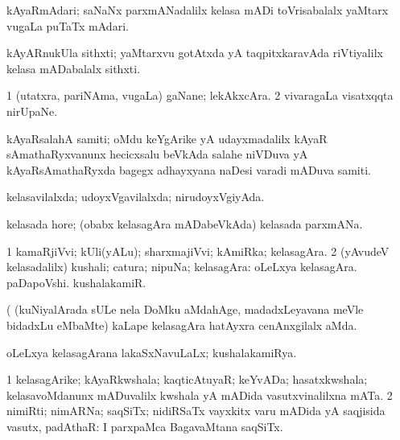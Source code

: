 \bentry
{} 
\gl{\nA}
\expl{}
\bmng
kAyaRmAdari; saNaNx parxmANadalilx kelasa mADi toVrisabalalx yaMtarx \mo vugaLa puTaTx mAdari. 
\emng
\eentry

\bentry
{} 
\gl{\nA}
\expl{}
\bmng
kAyARnukUla sithxti; yaMtarxvu gotAtxda yA taqpitxkaravAda riVtiyalilx kelasa mADabalalx sithxti. 
\emng
\eentry

\bentry
{} 
\gl{\nA}
\expl{}
\bmng
\bnum
\num{1} (utatxra, pariNAma, \mo vugaLa) gaNane; lekAkxcAra. 
\num{2} vivaragaLa visatxqqta nirUpaNe. 
\enum
\emng
\eentry

\bentry
{} 
\gl{\nA}
\expl{}
\bmng
kAyaRsalahA samiti; oMdu keYgArike yA udayxmadalilx kAyaR sAmathaRyxvanunx hecicxsalu beVkAda salahe niVDuva yA kAyaRsAmathaRyxda bagegx adhayxyana naDesi varadi mADuva samiti. 
\emng
\eentry

\bentry
{} 
\gl{\gu}
\expl{}
\bmng
kelasavilalxda; udoyxVgavilalxda; nirudoyxVgiyAda. 
\emng
\eentry

\bentry
{} 
\gl{\nA}
\expl{}
\bmng
kelasada hore; (obabx kelasagAra mADabeVkAda) kelasada parxmANa. 
\emng
\eentry

\bentry
{} 
\gl{\nA}
\bmng
\bnum
\num{1} kamaRjiVvi; kUli(yALu); sharxmajiVvi; kAmiRka; kelasagAra. 
\num{2} (yAvudeV kelasadalilx) kushali; catura; nipuNa; kelasagAra:  oLeLxya kelasagAra.  paDapoVshi.  kushalakamiR. 
\enum
\emng

\noindent
\gl{\pagu}
\expl{}
\bmng
{} (  (kuNiyalArada sULe nela DoMku aMdahAge, madadxLeyavana meVle bidadxLu eMbaMte) kaLape kelasagAra hatAyxra cenAnxgilalx aMda. 
\emng
\eentry

\bentry
{} 
\gl{\gu}
\expl{}
\bmng
oLeLxya kelasagArana lakaSxNavuLaLx; kushalakamiRya. 
\emng
\eentry

\bentry
{} 
\gl{\nA}
\expl{}
\bmng
\bnum
\num{1} kelasagArike; kAyaRkwshala; kaqticAtuyaR; keYvADa; hasatxkwshala; kelasavoMdanunx mADuvalilx kwshala yA mADida vasutxvinalilxna mATa. 
\num{2} nimiRti; nimARNa; saqSiTx; nidiRSaTx vayxkitx \mo varu mADida yA saqjisida vasutx, padAthaR:  I parxpaMca BagavaMtana saqSiTx. 
\enum
\emng
\eentry

